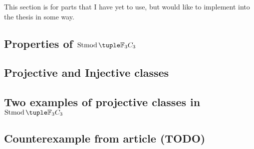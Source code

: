 
This section is for parts that I have yet to use, but would like to implement into the thesis in some way.

\subsection{Properties of \texorpdfstring{\( \Stmod{\Fb_3 C_3} \)}{Stmod(F\_3C\_3)}} 


\subsection{Projective and Injective classes}


\subsection{Two examples of projective classes in \texorpdfstring{\( \Stmod{\Fb_3 C_3} \)}{Stmod(F\_3C\_3)}}


\subsection{Counterexample from article (TODO)}


